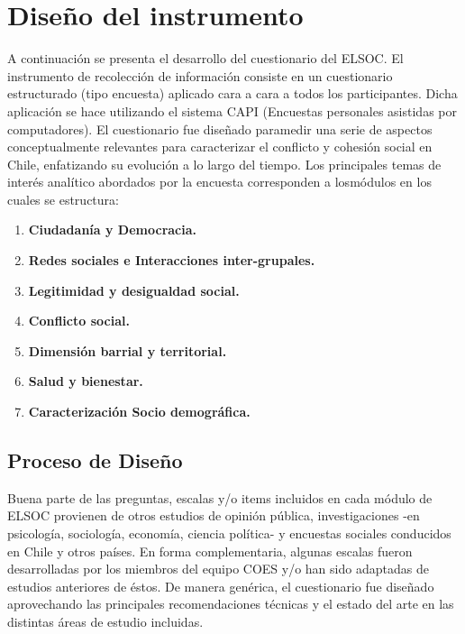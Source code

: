 \documentclass[
]{book}
\providecommand{\tightlist}{%
  \setlength{\itemsep}{0pt}\setlength{\parskip}{0pt}}
\begin{document}
\hypertarget{dis_ins}{%
\chapter{Diseño del instrumento}\label{dis_ins}}

A continuación se presenta el desarrollo del cuestionario del ELSOC. El instrumento de recolección de información consiste en un cuestionario estructurado (tipo encuesta) aplicado cara a cara a todos los participantes. Dicha aplicación se hace utilizando el sistema CAPI (Encuestas personales asistidas por computadores). El cuestionario fue diseñado paramedir una serie de aspectos conceptualmente relevantes para caracterizar el conflicto y cohesión social en Chile, enfatizando su evolución a lo largo del tiempo. Los principales temas de interés analítico abordados por la encuesta corresponden a losmódulos en los cuales se estructura:

\begin{enumerate}
\def\labelenumi{\arabic{enumi}.}
\tightlist
\item
  \textbf{Ciudadanía y Democracia.}
\item
  \textbf{Redes sociales e Interacciones inter-grupales.}
\item
  \textbf{Legitimidad y desigualdad social.}
\item
  \textbf{Conflicto social.}
\item
  \textbf{Dimensión barrial y territorial.}
\item
  \textbf{Salud y bienestar.}
\item
  \textbf{Caracterización Socio demográfica.}
\end{enumerate}

\hypertarget{proceso-de-diseuxf1o}{%
\section{Proceso de Diseño}\label{proceso-de-diseuxf1o}}

Buena parte de las preguntas, escalas y/o items incluidos en cada módulo de ELSOC provienen de otros estudios de opinión pública, investigaciones -en psicología, sociología, economía, ciencia política- y encuestas sociales conducidos en Chile y otros países. En forma complementaria, algunas escalas fueron desarrolladas por los miembros del equipo COES y/o han sido adaptadas de estudios anteriores de éstos. De manera genérica, el cuestionario fue diseñado aprovechando las principales recomendaciones técnicas y el estado del arte en las distintas áreas de estudio incluidas.
\end{document}
